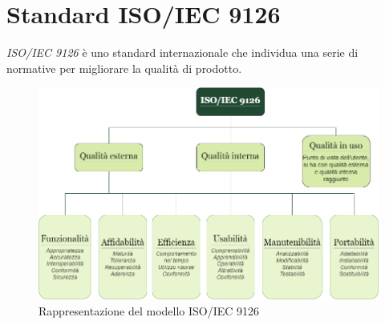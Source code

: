 \section{Standard ISO/IEC 9126}

\textit{ISO/IEC 9126} è uno standard internazionale che individua una serie
di normative per migliorare la qualità di prodotto.

\begin{figure}[h!]
	\centering
	\includegraphics[scale=0.50]{../../assets/Norme_di_progetto/ISO9126.png}
	\caption{Rappresentazione del modello ISO/IEC 9126}
\end{figure}

